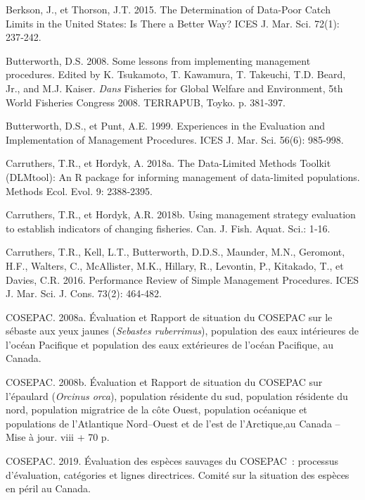 \documentclass[french,11pt]{book}
\begin{document}
\leavevmode\hypertarget{ref-berkson2015}{}%
Berkson, J., et Thorson, J.T. 2015. The Determination of Data-Poor Catch Limits in the United States: Is There a Better Way? ICES J. Mar. Sci. 72(1): 237‑242.

\leavevmode\hypertarget{ref-butterworth2008}{}%
Butterworth, D.S. 2008. Some lessons from implementing management procedures. Edited by K. Tsukamoto, T. Kawamura, T. Takeuchi, T.D. Beard, Jr., and M.J. Kaiser. \emph{Dans} Fisheries for Global Welfare and Environment, 5th World Fisheries Congress 2008. TERRAPUB, Toyko. p. 381‑397.

\leavevmode\hypertarget{ref-butterworth1999}{}%
Butterworth, D.S., et Punt, A.E. 1999. Experiences in the Evaluation and Implementation of Management Procedures. ICES J. Mar. Sci. 56(6): 985‑998.

\leavevmode\hypertarget{ref-carruthers2018}{}%
Carruthers, T.R., et Hordyk, A. 2018a. The Data-Limited Methods Toolkit (DLMtool): An R package for informing management of data-limited populations. Methods Ecol. Evol. 9: 2388‑2395.

\leavevmode\hypertarget{ref-carruthers_hordyk_2018}{}%
Carruthers, T.R., et Hordyk, A.R. 2018b. Using management strategy evaluation to establish indicators of changing fisheries. Can. J. Fish. Aquat. Sci.: 1‑16.

\leavevmode\hypertarget{ref-carruthers2016}{}%
Carruthers, T.R., Kell, L.T., Butterworth, D.D.S., Maunder, M.N., Geromont, H.F., Walters, C., McAllister, M.K., Hillary, R., Levontin, P., Kitakado, T., et Davies, C.R. 2016. Performance Review of Simple Management Procedures. ICES J. Mar. Sci. J. Cons. 73(2): 464‑482.

\leavevmode\hypertarget{ref-cosewic2008}{}%
COSEPAC. 2008a. Évaluation et Rapport de situation du COSEPAC sur le sébaste aux yeux jaunes (\emph{Sebastes ruberrimus}), population des eaux intérieures de l'océan Pacifique et population des eaux extérieures de l'océan Pacifique, au Canada.

\leavevmode\hypertarget{ref-cosewic2008b}{}%
COSEPAC. 2008b. Évaluation et Rapport de situation du COSEPAC sur l'épaulard (\emph{Orcinus orca}), population résidente du sud, population résidente du nord, population migratrice de la côte Ouest, population océanique et populations de l'Atlantique Nord--Ouest et de l'est de l'Arctique,au Canada -- Mise à jour. viii + 70 p.

\leavevmode\hypertarget{ref-cosewic2015}{}%
COSEPAC. 2019. Évaluation des espèces sauvages du COSEPAC~: processus d'évaluation, catégories et lignes directrices. Comité sur la situation des espèces en péril au Canada.
\end{document}
